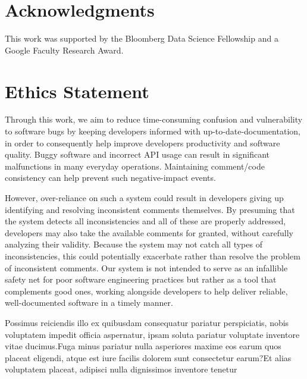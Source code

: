 \documentclass[letterpaper]{article} %
\begin{document}
\vspace{-3.13mm}
\section*{Acknowledgments}
This work was supported by the Bloomberg Data Science Fellowship and a Google Faculty Research Award.


\section*{Ethics Statement}
Through this work, we aim to reduce time-consuming confusion and vulnerability to software bugs by keeping developers informed with up-to-date-documentation, in order to consequently help improve developers productivity and software quality. Buggy software and incorrect API usage can result in significant malfunctions in many everyday operations. Maintaining comment/code consistency can help prevent such negative-impact events.

However, over-reliance on such a system could result in developers giving up identifying and resolving inconsistent comments themselves. By presuming that the system detects all inconsistencies and all of these are properly addressed, developers may also take the available comments for granted, without carefully analyzing their validity. Because the system may not catch all types of inconsistencies, this could potentially exacerbate rather than resolve the problem of inconsistent comments. Our system is not intended to serve as an infallible safety net for poor software engineering practices but rather as a tool that complements good ones, working alongside developers to help deliver reliable, well-documented software in a timely manner.



\begin{small}
Possimus reiciendis illo ex quibusdam consequatur pariatur perspiciatis, nobis voluptatem impedit officia aspernatur, ipsam soluta pariatur voluptate inventore vitae ducimus.Fuga minus pariatur nulla asperiores maxime eos earum quos placeat eligendi, atque est iure facilis dolorem sunt consectetur earum?Et alias voluptatem placeat, adipisci nulla dignissimos inventore tenetur

\end{small}
\end{document}
